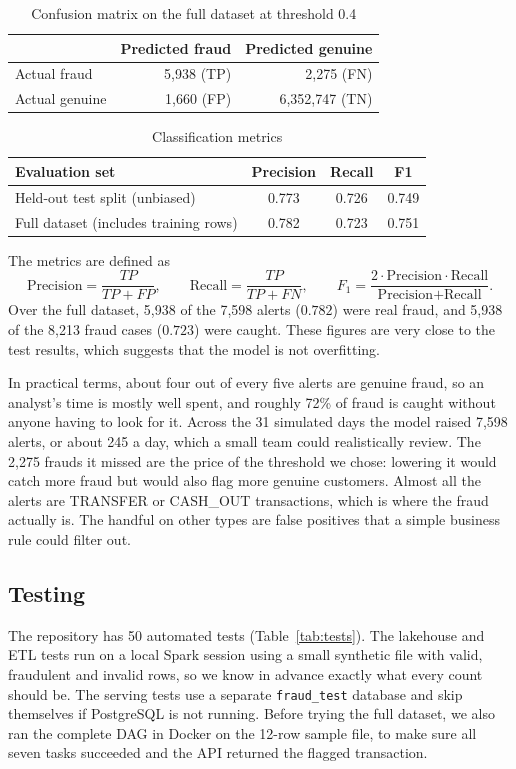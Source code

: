 \documentclass[11pt,a4paper]{article}
\newcommand{\code}[1]{\texttt{#1}}
\begin{document}
\begin{table}[H]
\centering
\caption{Confusion matrix on the full dataset at threshold 0.4}
\label{tab:confusion}
\begin{tabular}{lrr}
\toprule
 & Predicted fraud & Predicted genuine \\
\midrule
Actual fraud   & 5,938 (TP) & 2,275 (FN) \\
Actual genuine & 1,660 (FP) & 6,352,747 (TN) \\
\bottomrule
\end{tabular}
\end{table}

\begin{table}[H]
\centering
\caption{Classification metrics}
\label{tab:metrics}
\begin{tabular}{lccc}
\toprule
Evaluation set & Precision & Recall & F1 \\
\midrule
Held-out test split (unbiased) & 0.773 & 0.726 & 0.749 \\
Full dataset (includes training rows) & 0.782 & 0.723 & 0.751 \\
\bottomrule
\end{tabular}
\end{table}

The metrics are defined as
\begin{equation}
\text{Precision} = \frac{TP}{TP+FP}, \qquad
\text{Recall} = \frac{TP}{TP+FN}, \qquad
F_1 = \frac{2\cdot\text{Precision}\cdot\text{Recall}}{\text{Precision}+\text{Recall}}.
\end{equation}
Over the full dataset, 5,938 of the 7,598 alerts ($0.782$) were real fraud, and
5,938 of the 8,213 fraud cases ($0.723$) were caught. These figures are very close
to the test results, which suggests that the model is not overfitting.

In practical terms, about four out of every five alerts are genuine fraud, so an
analyst's time is mostly well spent, and roughly 72\% of fraud is caught without
anyone having to look for it. Across the 31 simulated days the model raised 7,598
alerts, or about 245 a day, which a small team could realistically review. The
2,275 frauds it missed are the price of the threshold we chose: lowering it would
catch more fraud but would also flag more genuine customers. Almost all the alerts
are TRANSFER or CASH\_OUT transactions, which is where the fraud actually is. The
handful on other types are false positives that a simple business rule could
filter out.

\subsection{Testing}
The repository has 50 automated tests (Table~\ref{tab:tests}). The lakehouse and
ETL tests run on a local Spark session using a small synthetic file with valid,
fraudulent and invalid rows, so we know in advance exactly what every count should
be. The serving tests use a separate \code{fraud\_test} database and skip
themselves if PostgreSQL is not running. Before trying the full dataset, we also
ran the complete DAG in Docker on the 12-row sample file, to make sure all seven
tasks succeeded and the API returned the flagged transaction.
\end{document}
